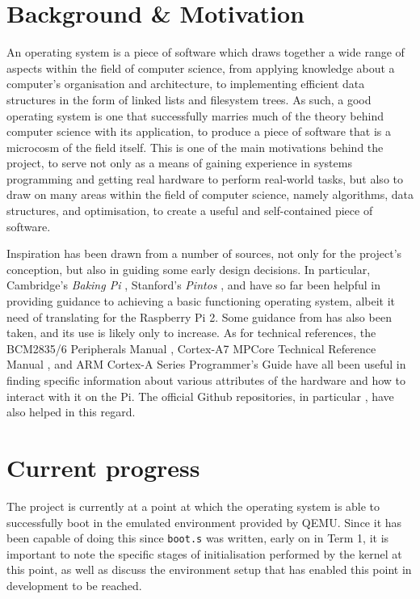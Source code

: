 \documentclass[10pt,a4paper]{article}
\newcommand{\code}[1]{\texttt{#1}}
\begin{document}
\section*{Background \& Motivation}
An operating system is a piece of software which draws together a wide range of
aspects within the field of computer science, from applying knowledge about a
computer's organisation and architecture, to implementing efficient data
structures in the form of linked lists and filesystem trees. As such, a good
operating system is one that successfully marries much of the theory behind
computer science with its application, to produce a piece of software that is a
microcosm of the field itself. This is one of the main motivations behind the
project, to serve not only as a means of gaining experience in systems
programming and getting real hardware to perform real-world tasks, but also to
draw on many areas within the field of computer science, namely algorithms, data
structures, and optimisation, to create a useful and self-contained piece of
software.

Inspiration has been drawn from a number of sources, not only for the project's
conception, but also in guiding some early design decisions. In particular,
Cambridge's \textit{Baking Pi} \cite{BakingPi}, Stanford's \textit{Pintos}
\cite{Pintos}, and \cite{jsandler} have so far been helpful in providing
guidance to achieving a basic functioning operating system, albeit it need of
translating for the Raspberry Pi 2. Some guidance from \cite{littleosbook} has
also been taken, and its use is likely only to increase. As for technical
references, the BCM2835/6 Peripherals Manual \cite{BCM2835, BCM2836}, Cortex-A7
MPCore Technical Reference Manual \cite{TRM}, and ARM Cortex-A Series
Programmer's Guide \cite{PG} have all been useful in finding specific
information about various attributes of the hardware and how to interact with it
on the Pi. The official Github repositories, in particular
\cite{PiDocumentation}, have also helped in this regard.

\section*{Current progress}
The project is currently at a point at which the operating system is able to
successfully boot in the emulated environment provided by QEMU. Since it has
been capable of doing this since \code{boot.s} was written, early on in Term 1,
it is important to note the specific stages of initialisation performed by the
kernel at this point, as well as discuss the environment setup that has enabled
this point in development to be reached.
\end{document}
